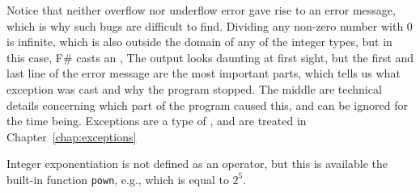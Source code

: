Notice that neither overflow nor underflow error gave rise to an error message, which is why such bugs are difficult to find. 
 Dividing any non-zero number with 0 is infinite, which is also outside the domain of any of the integer types, but in this case, F\# casts an ,
%
%
The output looks daunting at first sight, but the first and last line of the error message are the most important parts, which tells us what exception was cast and why the program stopped. The middle are technical details concerning which part of the program caused this, and can be ignored for the time being. Exceptions are a type of , and are treated in Chapter~\ref{chap:exceptions}

Integer exponentiation is not defined as an operator, but this is available the built-in function \lstinline|pown|, e.g.,
%
%
which is equal to $2^5$.

    
